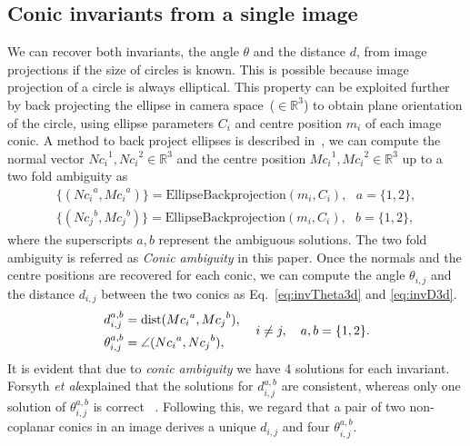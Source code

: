 \documentclass{bmvc2k}
\def\etal{\emph{et al}\bmvaOneDot}
\begin{document}
\subsection{Conic invariants from a single image}\label{ssec:conicInv2D}
We can recover both invariants, the angle $\theta$ and the distance $d$, from image projections if the size of circles is known.
This is possible because image projection of a circle is always elliptical. 
This property can be exploited further by back projecting the ellipse in camera space~($ \in \mathbb{R}^3 $) to obtain plane orientation of the circle, using ellipse parameters $C_i$ and centre position $m_i$ of each image conic.
A method to back project ellipses is described in~\cite{forsyth_91}, we can compute the normal vector ${Nc_i}^1,{Nc_i}^2 \in \mathbb{R}^3$ and the centre position ${Mc_i}^1, {Mc_i}^2 \in \mathbb{R}^3$ up to a two fold ambiguity as
\begin{align} \label{Eq:Backprojection}
\{ ( {Nc_i}^a,{Mc_i}^a ) \} = \text{EllipseBackprojection}(m_i,C_i),~~~ a = \{1,2\}, \\
\{ ( {Nc_j}^b,{Mc_j}^b ) \} = \text{EllipseBackprojection}(m_i,C_i),~~~ b = \{1,2\},
\end{align}
where the superscripts $a,b$ represent the ambiguous solutions. The two fold ambiguity is referred as \textit{ Conic ambiguity} in this paper. 
Once the normals and the centre positions are recovered for each conic, we can compute the angle $\theta_{i,j}$ and the distance $d_{i,j}$ between the two conics as Eq.~\ref{eq:invTheta3d} and \ref{eq:invD3d}. 
\begin{align}\label{eq:inv2D}
\left. \begin{aligned}
d_{i,j}^{a,b} &= {\rm dist}({Mc_i}^a,{Mc_j}^b),\\
\theta_{i,j}^{a,b} &= \angle({Nc_i}^a,{Nc_j}^b),
\end{aligned}
\right. ~~~i \neq j, ~~~ a,b = \{ 1,2 \}.
\end{align}
It is evident that due to \textit{conic ambiguity} we have 4 solutions for each invariant. 
Forsyth \etal explained that the solutions for $d_{i,j}^{a,b}$ are consistent, whereas only one solution of $\theta_{i,j}^{a,b}$ is correct ~\cite{forsyth_91}. Following this, we regard that a pair of two non-coplanar conics in an image derives a unique $d_{i,j}$ and four $\theta_{i,j}^{a,b}$.
\end{document}
